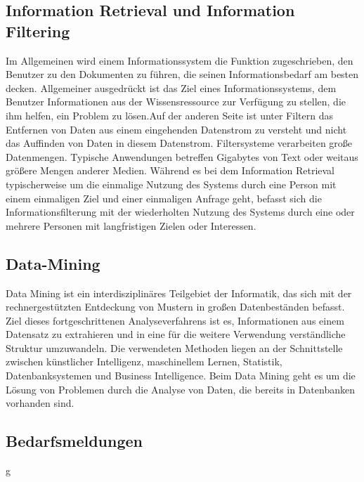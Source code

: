 \subsection{Information Retrieval und Information Filtering}
Im Allgemeinen wird einem Informationssystem die Funktion zugeschrieben, den Benutzer zu den Dokumenten zu führen, die seinen Informationsbedarf am besten decken. Allgemeiner ausgedrückt ist das Ziel eines Informationssystems, dem Benutzer Informationen aus der Wissensressource zur Verfügung zu stellen, die ihm helfen, ein Problem zu lösen.Auf der anderen Seite ist unter Filtern das Entfernen von Daten aus einem eingehenden Datenstrom zu versteht und nicht das Auffinden von Daten in diesem Datenstrom. Filtersysteme verarbeiten große Datenmengen. Typische Anwendungen betreffen Gigabytes von Text oder weitaus größere Mengen anderer Medien. Während es bei dem Information Retrieval typischerweise um die einmalige Nutzung des Systems durch eine Person mit einem einmaligen Ziel und einer einmaligen Anfrage geht, befasst sich die Informationsfilterung mit der wiederholten Nutzung des Systems durch eine oder mehrere Personen mit langfristigen Zielen oder Interessen.\cite{belkin1992information}
\subsection{Data-Mining}
Data Mining ist ein interdisziplinäres Teilgebiet der Informatik, das sich mit der rechnergestützten Entdeckung von Mustern in großen Datenbeständen befasst. Ziel dieses fortgeschrittenen Analyseverfahrens ist es, Informationen aus einem Datensatz zu extrahieren und in eine für die weitere Verwendung verständliche Struktur umzuwandeln. Die verwendeten Methoden liegen an der Schnittstelle zwischen künstlicher Intelligenz, maschinellem Lernen, Statistik, Datenbanksystemen und Business Intelligence. Beim Data Mining geht es um die Lösung von Problemen durch die Analyse von Daten, die bereits in Datenbanken vorhanden sind.\cite{jain2013data}
\subsection{Bedarfsmeldungen}

\newpage
g
\newpage





